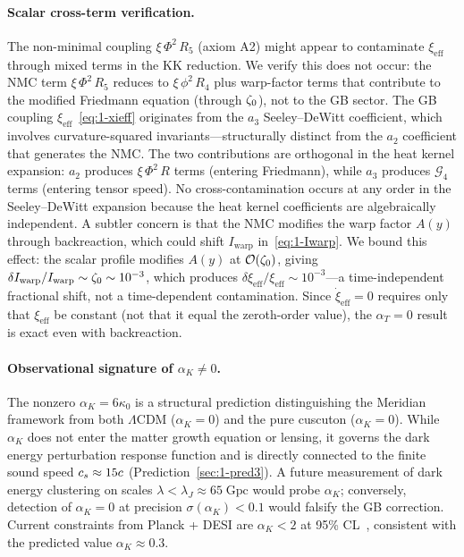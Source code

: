 \paragraph{Scalar cross-term verification.} The non-minimal coupling $\xi\,\Phi^2\,R_5$ (axiom A2) might appear to contaminate $\xi_{\mathrm{eff}}$ through mixed terms in the KK reduction. We verify this does not occur: the NMC term $\xi\,\Phi^2\,R_5$ reduces to $\xi\,\phi^2\,R_4$ plus warp-factor terms that contribute to the modified Friedmann equation (through $\zeta_0$), not to the GB sector. The GB coupling $\xi_{\mathrm{eff}}$~\eqref{eq:1-xieff} originates from the $a_3$ Seeley--DeWitt coefficient, which involves curvature-squared invariants---structurally distinct from the $a_2$ coefficient that generates the NMC. The two contributions are orthogonal in the heat kernel expansion: $a_2$ produces $\xi\,\Phi^2\,R$ terms (entering Friedmann), while $a_3$ produces $\mathcal{G}_4$ terms (entering tensor speed). No cross-contamination occurs at any order in the Seeley--DeWitt expansion because the heat kernel coefficients are algebraically independent. A subtler concern is that the NMC modifies the warp factor $A(y)$ through backreaction, which could shift $I_{\mathrm{warp}}$ in~\eqref{eq:1-Iwarp}. We bound this effect: the scalar profile modifies $A(y)$ at $\mathcal{O}\!\left(\zeta_0\right)$, giving $\delta I_{\mathrm{warp}}/I_{\mathrm{warp}} \sim \zeta_0 \sim 10^{-3}$, which produces $\delta\xi_{\mathrm{eff}}/\xi_{\mathrm{eff}} \sim 10^{-3}$---a time-independent fractional shift, not a time-dependent contamination. Since $\dot{\xi}_{\mathrm{eff}} = 0$ requires only that $\xi_{\mathrm{eff}}$ be constant (not that it equal the zeroth-order value), the $\alpha_T = 0$ result is exact even with backreaction.

\paragraph{Observational signature of $\alpha_K \neq 0$.} The nonzero $\alpha_K = 6\kappa_0$ is a structural prediction distinguishing the Meridian framework from both $\Lambda$CDM ($\alpha_K = 0$) and the pure cuscuton ($\alpha_K = 0$). While $\alpha_K$ does not enter the matter growth equation or lensing, it governs the dark energy perturbation response function and is directly connected to the finite sound speed $c_s \approx 15c$ (Prediction~\ref{sec:1-pred3}). A future measurement of dark energy clustering on scales $\lambda < \lambda_J \approx 65\;\mathrm{Gpc}$ would probe $\alpha_K$; conversely, detection of $\alpha_K = 0$ at precision $\sigma(\alpha_K) < 0.1$ would falsify the GB correction. Current constraints from Planck + DESI are $\alpha_K < 2$ at 95\% CL~\cite{ch1:bellini-sawicki}, consistent with the predicted value $\alpha_K \approx 0.3$.


